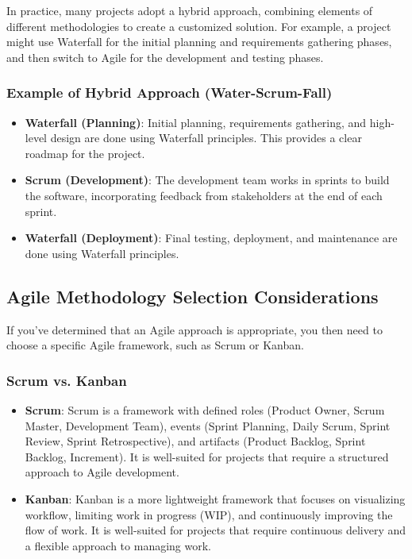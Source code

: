 In practice, many projects adopt a hybrid approach, combining elements of
different methodologies to create a customized solution. For example, a project
might use Waterfall for the initial planning and requirements gathering phases,
and then switch to Agile for the development and testing phases.

\subsubsection{Example of Hybrid Approach (Water-Scrum-Fall)}

\begin{itemize}
  \item \textbf{Waterfall (Planning)}: Initial planning, requirements gathering, and high-level design are done using Waterfall principles. This provides a clear roadmap for the project.
  \item \textbf{Scrum (Development)}: The development team works in sprints to build the software, incorporating feedback from stakeholders at the end of each sprint.
  \item \textbf{Waterfall (Deployment)}: Final testing, deployment, and maintenance are done using Waterfall principles.
\end{itemize}

\subsection{Agile Methodology Selection Considerations}

If you've determined that an Agile approach is appropriate, you then need to
choose a specific Agile framework, such as Scrum or Kanban.

\subsubsection{Scrum vs. Kanban}

\begin{itemize}
  \item \textbf{Scrum}: Scrum is a framework with defined roles (Product Owner, Scrum Master, Development Team), events (Sprint Planning, Daily Scrum, Sprint Review, Sprint Retrospective), and artifacts (Product Backlog, Sprint Backlog, Increment). It is well-suited for projects that require a structured approach to Agile development.
  \item \textbf{Kanban}: Kanban is a more lightweight framework that focuses on visualizing workflow, limiting work in progress (WIP), and continuously improving the flow of work. It is well-suited for projects that require continuous delivery and a flexible approach to managing work.
\end{itemize}


